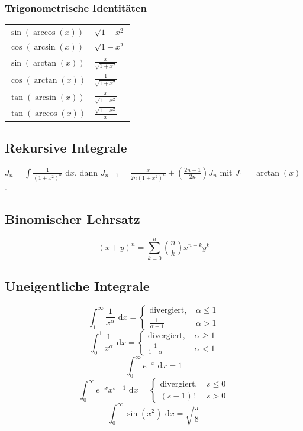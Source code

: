 \documentclass[a4paper,10pt]{article}
\def\dx{\text{ d}x}
\begin{document}
\subsubsection{Trigonometrische Identitäten}
\begin{center}
 \begin{tabularx}{\linewidth}{>{\centering\arraybackslash}X>{\centering\arraybackslash}X}
  \toprule
  $\sin(\arccos (x))$ & $\sqrt{1-x^2}$\\
  $\cos(\arcsin(x))$ & $\sqrt{1-x^2}$\\
  $\sin(\arctan(x))$ & $\frac{x}{\sqrt{1+x^2}}$\\
  $\cos(\arctan(x))$ & $\frac{1}{\sqrt{1+x^2}}$\\
  $\tan(\arcsin(x))$ & $\frac{x}{\sqrt{1-x^2}}$\\
  $\tan(\arccos(x))$ & $\frac{\sqrt{1-x^2}}{x}$\\
  \bottomrule
 \end{tabularx}
\end{center}

\subsection{Rekursive Integrale}

$J_n = \int \frac{1}{(1 + x^2)^n} \dx$, dann $J_{n+1} = \frac{x}{2n(1 + x^2)^n} + (\frac{2n - 1}{2n})J_n$ mit $J_1 = \arctan(x)$.

\subsection{Binomischer Lehrsatz}

$$(x+y)^n = \sum_{k=0}^n {n \choose k} x^{n-k} y^k$$

\subsection{Uneigentliche Integrale}
$$\int_1^\infty \frac{1}{x^\alpha} \dx = \begin{cases}
  \text{divergiert, } & \alpha \leq 1\\
  \frac{1}{\alpha - 1} & \alpha > 1
\end{cases}$$
$$\int_0^1 \frac{1}{x^\alpha} \dx = \begin{cases}
  \text{divergiert, } & \alpha \geq 1\\
  \frac{1}{1- \alpha} & \alpha < 1
\end{cases}$$
$$\int_0^\infty e^{-x} \dx = 1$$
$$\int_0^\infty e^{-x}x^{s-1} \dx = \begin{cases}
  \text{divergiert, } & s \leq 0\\
  (s-1)! & s > 0
\end{cases}$$
$$\int_0^\infty \sin(x^2) \dx = \sqrt{\frac{\pi}{8}}$$
\end{document}

